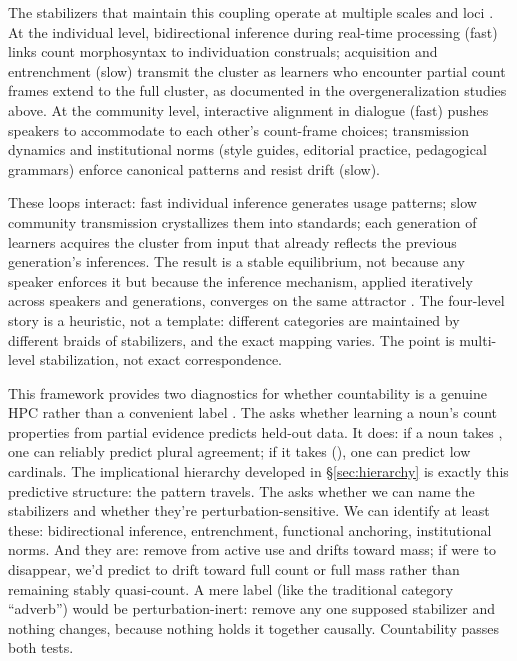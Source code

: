\documentclass[12pt,a4paper]{article}
\begin{document}
The stabilizers that maintain this coupling operate at multiple scales and loci \citep{reynolds2025stack}. At the individual level, bidirectional inference during real-time processing (fast) links count morphosyntax to individuation construals; acquisition and entrenchment (slow) transmit the cluster as learners who encounter partial count frames extend to the full cluster, as documented in the overgeneralization studies above. At the community level, interactive alignment in dialogue (fast) pushes speakers to accommodate to each other's count-frame choices; transmission dynamics and institutional norms (style guides, editorial practice, pedagogical grammars) enforce canonical patterns and resist drift (slow).

These loops interact: fast individual inference generates usage patterns; slow community transmission crystallizes them into standards; each generation of learners acquires the cluster from input that already reflects the previous generation's inferences. The result is a stable equilibrium, not because any speaker enforces it but because the inference mechanism, applied iteratively across speakers and generations, converges on the same attractor \citep{strogatz2015,kirby2008}. The four-level story is a heuristic, not a template: different categories are maintained by different braids of stabilizers, and the exact mapping varies. The point is multi-level stabilization, not exact correspondence.

This framework provides two diagnostics for whether countability is a genuine HPC rather than a convenient label \citep{reynolds2025stack}. The  asks whether learning a noun's count properties from partial evidence predicts held-out data. It does: if a noun takes , one can reliably predict plural agreement; if it takes (), one can predict low cardinals. The implicational hierarchy developed in \S\ref{sec:hierarchy} is exactly this predictive structure: the pattern travels. The  asks whether we can name the stabilizers and whether they're perturbation-sensitive. We can identify at least these: bidirectional inference, entrenchment, functional anchoring, institutional norms. And they are: remove  from active use and  drifts toward mass; if  were to disappear, we'd predict  to drift toward full count or full mass rather than remaining stably quasi-count. A mere label (like the traditional category \enquote{adverb}) would be perturbation-inert: remove any one supposed stabilizer and nothing changes, because nothing holds it together causally. Countability passes both tests.
\end{document}
